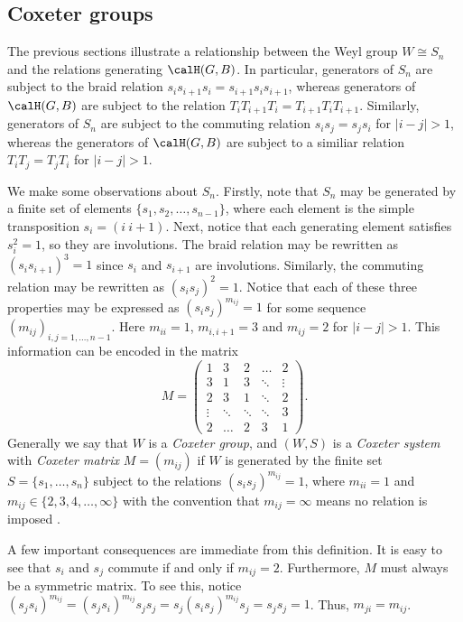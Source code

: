 \documentclass[11pt]{amsart}
\theoremstyle{remark}
\begin{document}

\subsection{Coxeter groups}\label{Section3.5}
The previous sections illustrate a relationship between the Weyl group $W\cong S_n$ and the relations generating $\calH(G,B)$.
In particular, generators of $S_n$ are subject to the braid relation $s_is_{i+1}s_i=s_{i+1}s_is_{i+1}$, whereas generators of $\calH(G,B)$ are subject to the relation $T_iT_{i+1}T_i=T_{i+1}T_iT_{i+1}$.
Similarly, generators of $S_n$ are subject to the commuting relation $s_is_j=s_js_i$ for $|i-j|>1$, whereas the generators of $\calH(G,B)$ are subject to a similiar relation $T_iT_j=T_jT_i$ for $|i-j|>1$.

We make some observations about $S_n$.
Firstly, note that $S_n$ may be generated by a finite set of elements $\{s_1,s_2,\ldots,s_{n-1}\}$, where each element is the simple transposition $s_i = (i\ i+1)$.
Next, notice that each generating element satisfies $s_i^2=1$, so they are involutions.
The braid relation may be rewritten as $(s_is_{i+1})^3 = 1$ since $s_i$ and $s_{i+1}$ are involutions.
Similarly, the commuting relation may be rewritten as $(s_is_j)^2=1$.
Notice that each of these three properties may be expressed as $(s_is_j)^{m_{ij}}=1$ for some sequence $(m_{ij})_{i,j=1,\ldots,n-1}$.
Here $m_{ii}=1$, $m_{i,i+1}=3$ and $m_{ij}=2$ for $|i-j|>1$.
This information can be encoded in the matrix
\[
	M = \begin{pmatrix}
		1      & 3      & 2      & \hdots & 2      \\
		3      & 1      & 3      & \ddots & \vdots \\
		2      & 3      & 1      & \ddots & 2      \\
		\vdots & \ddots & \ddots & \ddots & 3      \\
		2      & \hdots & 2      & 3      & 1
	\end{pmatrix}.
\]
Generally we say that $W$ is a \emph{Coxeter group}, and $(W,S)$ is a \emph{Coxeter system} with \emph{Coxeter matrix} $M=(m_{ij})$ if $W$ is generated by the finite set $S=\{s_1,\ldots,s_n\}$ subject to the relations $(s_is_j)^{m_{ij}}=1$, where $m_{ii}=1$ and $m_{ij}\in\{2,3,4,\ldots,\infty\}$ with the convention that $m_{ij}=\infty$ means no relation is imposed \cite{Humphreys90}.

A few important consequences are immediate from this definition.
It is easy to see that $s_i$ and $s_j$ commute if and only if $m_{ij}=2$.
Furthermore, $M$ must always be a symmetric matrix.
To see this, notice $(s_js_i)^{m_{ij}} = (s_js_i)^{m_{ij}}s_js_j = s_j(s_is_j)^{m_{ij}}s_j = s_js_j = 1$.
Thus, $m_{ji}=m_{ij}$.
\end{document}

